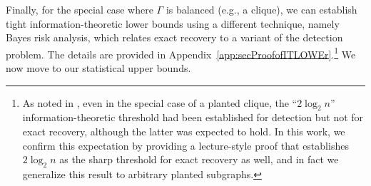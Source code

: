 \documentclass[12pt]{article}
\begin{document}
Finally, for the special case where $\Gamma$ is balanced \cite{bollobas_1981} (e.g., a clique), we can establish tight information-theoretic lower bounds using a different technique, namely Bayes risk analysis, which relates exact recovery to a variant of the detection problem. The details are provided in Appendix~\ref{app:secProofofITLOWEr}.\footnote{As noted in \cite[pg.~7]{wein2025computational}, even in the special case of a planted clique, the ``$2\log_2 n$'' information-theoretic threshold had been established for detection but not for exact recovery, although the latter was expected to hold. In this work, we confirm this expectation by providing a lecture-style proof that establishes $2\log_2 n$ as the sharp threshold for exact recovery as well, and in fact we generalize this result to arbitrary planted subgraphs.} We now move to our statistical upper bounds.
\end{document}
